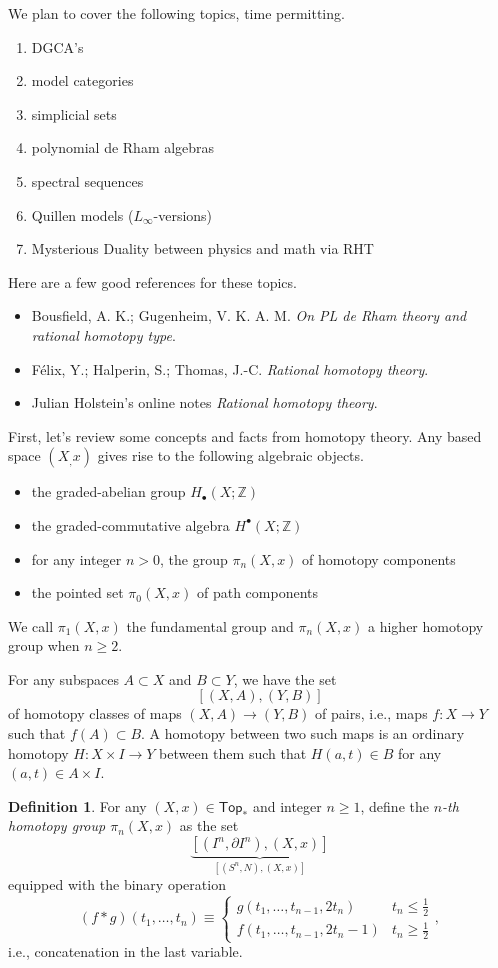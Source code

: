 \documentclass[10pt,letterpaper,cm]{nupset}
\theoremstyle{definition}
\newtheorem{defn}{Definition}[subsection]
\theoremstyle{theorem}
\theoremstyle{remark}
\newcommand{\Z}{\mathbb Z}
\newcommand{\1}{\mathbb{1}}
\newcommand{\0}{\vec 0}
\newcommand{\bi}{\begin{itemize}}
\newcommand{\ei}{\end{itemize}}
\newcommand{\be}{\begin{enumerate}}
\newcommand{\ee}{\end{enumerate}}
\begin{document}
\medskip

We plan to cover the following topics, time permitting.
\be
\item DGCA's
\item model categories
\item simplicial sets
\item polynomial de Rham algebras
\item spectral sequences
\item Quillen models ($L_{\infty}$-versions)
\item Mysterious Duality between physics and math via RHT
\ee

Here are a few good references for these topics.

\bi
\item Bousfield, A. K.; Gugenheim, V. K. A. M. \textit{On PL de Rham theory and rational homotopy type}.
\item F\'{e}lix, Y.; Halperin, S.; Thomas, J.-C. \textit{Rational homotopy theory}.
\item Julian Holstein's online notes  \textit{Rational homotopy theory}.
\ei

\bigskip

First, let's review some concepts and facts from homotopy theory.  Any based space $\left(X_,x\right)$ gives rise to the following algebraic objects.

\bi
\item the graded-abelian group $H_{\bullet}(X;\Z)$
\item the graded-commutative algebra $H^{\bullet}(X;\Z)$
\item for any integer $n>0$, the group $\pi_n(X,x)$ of homotopy components
\item the pointed set $\pi_0(X,x)$ of path components
\ei

We call $\pi_1(X,x)$ the fundamental group and $\pi_n(X,x)$ a higher homotopy group when $n\geq 2$.

\medskip

For any subspaces $A \subset X$ and $B\subset Y$, we have the set  
\[
 \left[\left(X,A\right), \left(Y,B\right)\right]
 \] of homotopy classes of maps $\left(X,A\right)\to \left(Y,B\right)$ of pairs, i.e., maps $f:X \to Y$ such that $f(A) \subset B$. A homotopy between two such maps is an ordinary homotopy $H: X \times I \to Y$ between them such that $H(a,t) \in B$ for any $\left(a,t\right) \in A \times I$. 

\begin{defn}
For any $\left(X,x\right) \in \mathsf{Top}_{\ast}$ and integer $n\geq 1$, define the \textit{$n$-th homotopy group $\pi_n(X,x)$} as the set
\[
\underbrace{\left[\left(I^n, \partial{I^n}\right), \left(X,x\right)\right]}_{\left[\left(S^n, N\right), \left(X,x\right)\right]}
\] equipped with the binary operation
\[
\left(f\ast g\right)(t_1, \ldots, t_n) \equiv 
\begin{cases}
g(t_1, \ldots, t_{n-1}, 2t_n) & t_n \leq \frac{1}2{}
\\ f(t_1, \ldots, t_{n-1}, 2t_n -1) & t_n \geq \frac{1}{2}
\end{cases}
,\] i.e., concatenation in the last variable.
\end{defn}
\end{document}
